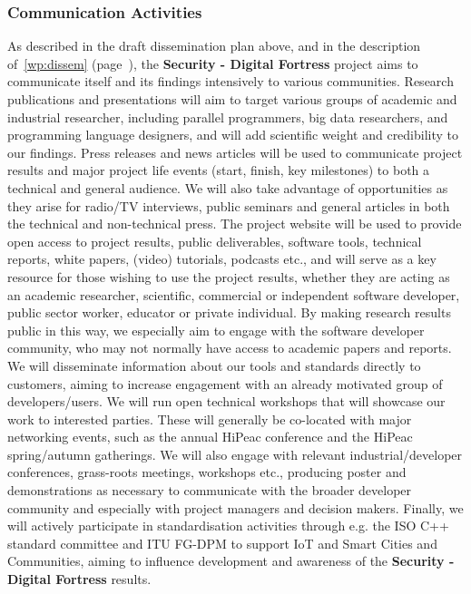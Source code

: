 \documentclass[a4paper,11pt]{article}
\newcommand{\project}[1]{\textbf{#1}\xspace}
\newcommand{\SECURITY}{\project{Security - Digital Fortress}}
\newcommand{\TheProject}{\SECURITY}
\begin{document}
\draftpage
\subsubsection{Communication Activities}
\label{sect:comm-activities}


As described in the draft dissemination plan above, and in the description of~\ref{wp:dissem} (page~\pageref{wp:dissem}),
the \TheProject{} project aims to communicate itself and its findings intensively to various communities.
Research publications and presentations will aim to target various groups of academic and industrial researcher,
including parallel programmers, big data researchers, and programming language
designers, and will add scientific weight and credibility to our findings.  Press releases and news articles will be used to communicate project results and major
project life events (start, finish, key milestones) to both a technical and general audience.
We will also take advantage of opportunities as they arise for radio/TV interviews, public seminars and general articles
in both the technical and non-technical press.
The project website will be used to provide open access to project results, public deliverables,
software tools, technical reports, white papers, (video) tutorials, podcasts etc., and will serve
as a key resource for those wishing to use the project results, whether they are acting as an academic researcher, scientific, commercial or independent
software developer, public sector worker,  educator or private individual.
By making research results public in this way, we especially aim to engage with the software developer
community, who may not normally have access to academic papers and reports.
We will disseminate information about our tools and standards directly to customers, aiming to
increase engagement with an already motivated group of developers/users.
We will run open technical workshops that will showcase our work to interested parties.
These will generally be co-located with major networking events, such as the annual HiPeac
conference and the HiPeac spring/autumn gatherings.
We will also engage with relevant industrial/developer conferences, grass-roots meetings, workshops etc.,
producing poster and demonstrations as necessary to communicate with the broader developer community
and especially with project managers and decision makers.
Finally, we will actively participate in standardisation activities through e.g. the ISO C++ standard committee and ITU FG-DPM to support IoT and Smart Cities and Communities,
aiming to influence development and awareness of the \TheProject{} results.
\end{document}

